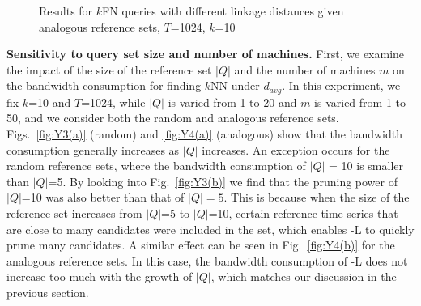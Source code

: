 \begin{figure}[tb]
{}
\hspace{0.1cm}
\vspace{-0.05in}
\caption{Results for $k$FN queries with different linkage distances given analogous reference sets, $T$=1024, $k$=10}
\label{fig:Y5}
\end{figure}

\textbf{Sensitivity to query set size and number of machines.}  First,
we examine the impact of the size of the reference set $|Q|$ and the
number of machines $m$ on the bandwidth consumption for finding $k$NN
under $d_{avg}$. In this experiment, we fix $k$=10 and $T$=1024, while
$|Q|$ is varied from 1 to 20 and $m$ is varied from 1 to 50, and we
consider both the random and analogous reference sets.
Figs.~\ref{fig:Y3(a)} (random) and \ref{fig:Y4(a)} (analogous) show
that the bandwidth consumption generally increases as $|Q|$ increases. 
An exception occurs for the random reference sets, where the bandwidth 
consumption of $|Q|$ = 10 is smaller than $|Q|$=5. By looking into
Fig.~\ref{fig:Y3(b)} we find that the pruning power of $|Q|$=10 was
also better than that of $|Q|=5$. This is because when the size of
the reference set increases from $|Q|$=5 to $|Q|$=10, certain reference
time series that are close to many candidates were included in the set,
which enables \MSWave-L{} to quickly prune many candidates. A similar
effect can be seen in Fig.~\ref{fig:Y4(b)} for the analogous reference
sets. In this case, the bandwidth consumption of \MSWave-L{} does not
increase too much with the growth of $|Q|$, which matches our
discussion in the previous section.

